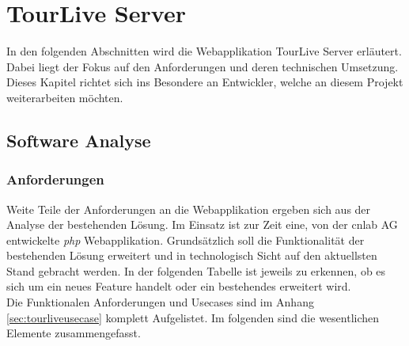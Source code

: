 \chapter{TourLive Server}
\label{sec:tourliveserver}
In den folgenden Abschnitten wird die Webapplikation TourLive Server erläutert. Dabei liegt der Fokus auf den Anforderungen und deren technischen Umsetzung. Dieses Kapitel richtet sich ins Besondere an Entwickler, welche an diesem Projekt weiterarbeiten möchten.

\section{Software Analyse}
\subsection{Anforderungen}
Weite Teile der Anforderungen an die Webapplikation ergeben sich aus der Analyse der bestehenden Lösung. Im Einsatz ist zur Zeit eine, von der cnlab AG entwickelte \textit{\gls{php}} Webapplikation. Grundsätzlich soll die Funktionalität der bestehenden Lösung erweitert und in technologisch Sicht auf den aktuellsten Stand gebracht werden. In der folgenden Tabelle ist jeweils zu erkennen, ob es sich um ein neues Feature handelt oder ein bestehendes erweitert wird.
\\
Die Funktionalen Anforderungen und Usecases sind im Anhang \ref{sec:tourliveusecase} komplett Aufgelistet. Im folgenden sind die wesentlichen Elemente zusammengefasst.

